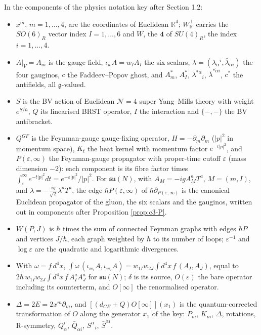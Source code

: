 \begin{remark}
In the components of the physics notation key after Section 1.2:
\begin{itemize}
\item $x^m$, $m=1,\dots,4$, are the coordinates of Euclidean $\mathbb R^4$; $W_{\mathbb R}^\perp$ carries the $SO(6)_R$ vector index $I=1,\dots,6$ and $W$, the $\mathbf 4$ of $SU(4)_R$, the index $i=1,\dots,4$.
\item $A|_V=A_m$ is the gauge field, $\iota_wA=w_IA_I$ the six scalars, $\lambda=(\lambda_\alpha{}^i,\bar\lambda_{\dot\alpha i})$ the four gauginos, $c$ the Faddeev--Popov ghost, and $A^*_m$, $A^*_I$, $\lambda^{*\alpha}{}_i$, $\bar\lambda^{*\dot\alpha i}$, $c^*$ the antifields, all $\mathfrak g$-valued.
\item $S$ is the BV action of Euclidean $\mathcal N=4$ super Yang--Mills theory with weight $e^{S/\hbar}$, $Q$ its linearised BRST operator, $I$ the interaction and $\{-,-\}$ the BV antibracket.
\item $Q^{GF}$ is the Feynman-gauge gauge-fixing operator, $H=-\partial_m\partial_m$ ($|p|^2$ in momentum space), $K_t$ the heat kernel with momentum factor $e^{-t|p|^2}$, and $P(\varepsilon,\infty)$ the Feynman-gauge propagator with proper-time cutoff $\varepsilon$ (mass dimension $-2$): each component is its fibre factor times $\int_\varepsilon^\infty e^{-t|p|^2}dt=e^{-\varepsilon|p|^2}/|p|^2$. For $\mathfrak{su}(N)$, with $A_M=-igA^a_MT^a$, $M=(m,I)$, and $\lambda=-\tfrac{ig}{\sqrt2}\lambda^aT^a$, the edge $\hbar P(\varepsilon,\infty)$ of $\hbar\partial_{P(\varepsilon,\infty)}$ is the canonical Euclidean propagator of the gluon, the six scalars and the gauginos, written out in components after Proposition \ref{prop:c3-P}.
\item $W(P,J)$ is $\hbar$ times the sum of connected Feynman graphs with edges $\hbar P$ and vertices $J/\hbar$, each graph weighted by $\hbar$ to its number of loops; $\varepsilon^{-1}$ and $\log\varepsilon$ are the quadratic and logarithmic divergences.
\item With $\omega=f\,d^4x$, $\int\omega\,(\iota_{w_1}A,\iota_{w_2}A)=w_{1I}w_{2J}\int d^4x\,f\,(A_I,A_J)$, equal to $2\hbar\,w_{1I}w_{2J}\int d^4x\,f\,A^a_IA^a_J$ for $\mathfrak{su}(N)$; $\delta$ is its source, $O(\varepsilon)$ the bare operator including its counterterm, and $O[\infty]$ the renormalised operator.
\item $\Delta=2E=2x^m\partial_m$, and $[(d_{CE}+Q)O[\infty]](x_1)$ is the quantum-corrected transformation of $O$ along the generator $x_1$ of the key: $P_m$, $K_m$, $\Delta$, rotations, R-symmetry, $Q^i_\alpha$, $\bar Q_{\dot\alpha i}$, $S^\alpha{}_i$, $\bar S^{\dot\alpha i}$.
\end{itemize}
\end{remark}


